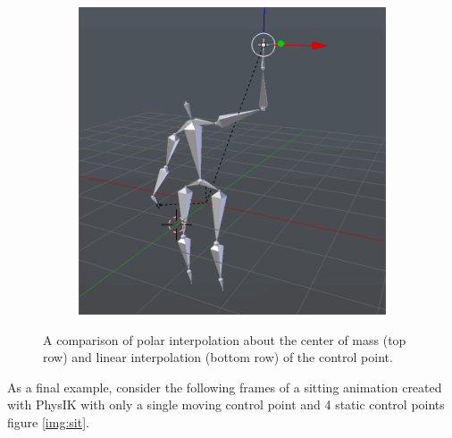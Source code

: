 \documentclass[10pt,twocolumn,letterpaper]{article}
\begin{document}
\begin{figure}[h]
\begin{subfigure}{0.2\textwidth}
        \centering
        \includegraphics[width=.9\linewidth]{raise-linear-4.png}
    \end{subfigure}

    \caption{A comparison of polar interpolation about the center of mass (top row) and linear interpolation (bottom row) of the control point.}
    \label{img:raise}
\end{figure}

As a final example, consider the following frames of a sitting animation created with PhysIK with only a single moving control point and 4 static control points figure \ref{img:sit}. 
\end{document}
